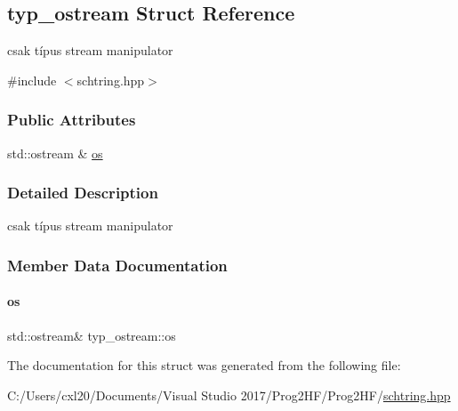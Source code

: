 \hypertarget{structtyp__ostream}{}\subsection{typ\+\_\+ostream Struct Reference}
\label{structtyp__ostream}


csak típus stream manipulator  




{\ttfamily \#include $<$schtring.\+hpp$>$}

\subsubsection*{Public Attributes}
\begin{DoxyCompactItemize}
\item 
std\+::ostream \& \mbox{\hyperlink{structtyp__ostream_abe1bfb5a7bc63e77dbcba6b952e48d7f}{os}}
\end{DoxyCompactItemize}


\subsubsection{Detailed Description}
csak típus stream manipulator 

\subsubsection{Member Data Documentation}
\mbox{\label{structtyp__ostream_abe1bfb5a7bc63e77dbcba6b952e48d7f}} 
\paragraph{\texorpdfstring{os}{os}}
{\footnotesize\ttfamily std\+::ostream\& typ\+\_\+ostream\+::os}



The documentation for this struct was generated from the following file\+:\begin{DoxyCompactItemize}
\item 
C\+:/\+Users/cxl20/\+Documents/\+Visual Studio 2017/\+Prog2\+H\+F/\+Prog2\+H\+F/\mbox{\hyperlink{schtring_8hpp}{schtring.\+hpp}}\end{DoxyCompactItemize}
